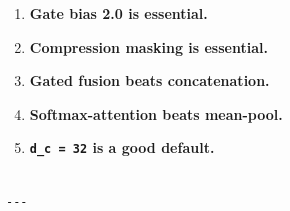 \begin{enumerate}
\item \textbf{Gate bias 2.0 is essential.}
\item \textbf{Compression masking is essential.}
\item \textbf{Gated fusion beats concatenation.}
\item \textbf{Softmax-attention beats mean-pool.}
\item \textbf{\texttt{d\_c = 32} is a good default.}
\end{enumerate}
\begin{lstlisting}

---
\end{lstlisting}